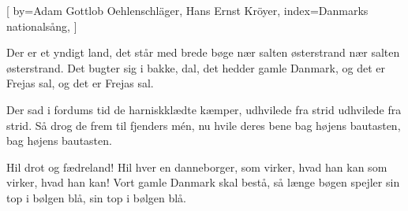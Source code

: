 

[
by={Adam Gottlob Oehlenschläger, Hans Ernst Kröyer},
index={Danmarks nationalsång},
]

\beginverse*
Der er et yndigt land, 
det står med brede bøge 
nær salten østerstrand 
nær salten østerstrand. 
Det bugter sig i bakke, dal, 
det hedder gamle Danmark, 
og det er Frejas sal, 
og det er Frejas sal.
\endverse

\beginverse*
Der sad i fordums tid 
de harniskklædte kæmper, 
udhvilede fra strid 
udhvilede fra strid. 
Så drog de frem til fjenders mén, 
nu hvile deres bene 
bag højens bautasten, 
bag højens bautasten.
\endverse

\beginverse*
Hil drot og fædreland! 
Hil hver en danneborger, 
som virker, hvad han kan 
som virker, hvad han kan! 
Vort gamle Danmark skal bestå, 
så længe bøgen spejler 
sin top i bølgen blå, 
sin top i bølgen blå.
\endverse
\endsong


